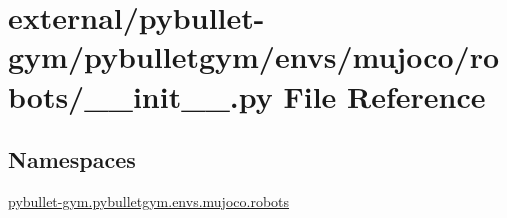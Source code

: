 \hypertarget{external_2pybullet-gym_2pybulletgym_2envs_2mujoco_2robots_2____init_____8py}{}\section{external/pybullet-\/gym/pybulletgym/envs/mujoco/robots/\+\_\+\+\_\+init\+\_\+\+\_\+.py File Reference}
\label{external_2pybullet-gym_2pybulletgym_2envs_2mujoco_2robots_2____init_____8py}
\subsection*{Namespaces}
\begin{DoxyCompactItemize}
\item 
 \hyperlink{namespacepybullet-gym_1_1pybulletgym_1_1envs_1_1mujoco_1_1robots}{pybullet-\/gym.\+pybulletgym.\+envs.\+mujoco.\+robots}
\end{DoxyCompactItemize}
